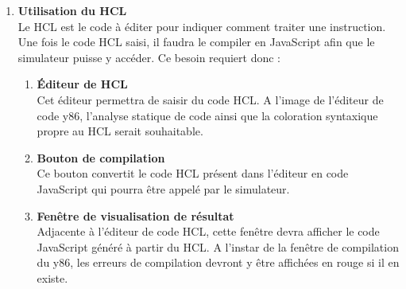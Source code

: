 \documentclass[french]{article}
\newcommand{\itembf}[1]{\item \textbf{#1}\\}
\begin{document}
\begin{enumerate}
\begin{enumerate}
\begin{enumerate}
            \itembf{Utilisation du HCL}
            Le HCL est le code à éditer pour indiquer comment traiter une instruction. Une fois le code HCL saisi, il faudra le compiler en JavaScript afin que le simulateur puisse y accéder. Ce besoin requiert donc :
            \begin{enumerate}
                \itembf{Éditeur de HCL}
                Cet éditeur permettra de saisir du code HCL. A l'image de l'éditeur de code y86, l'analyse statique de code ainsi que la coloration syntaxique propre au HCL serait souhaitable.
                
                \itembf{Bouton de compilation}
                Ce bouton convertit le code HCL présent dans l'éditeur en code JavaScript qui pourra être appelé par le simulateur. 
                
                \itembf{Fenêtre de visualisation de résultat}
                Adjacente à l'éditeur de code HCL, cette fenêtre devra afficher le code JavaScript généré à partir du HCL. A l'instar de la fenêtre de compilation du y86, les erreurs de compilation devront y être affichées en rouge si il en existe.
            \end{enumerate}
        \end{enumerate}
    \end{enumerate}
\end{enumerate}
\end{document}
